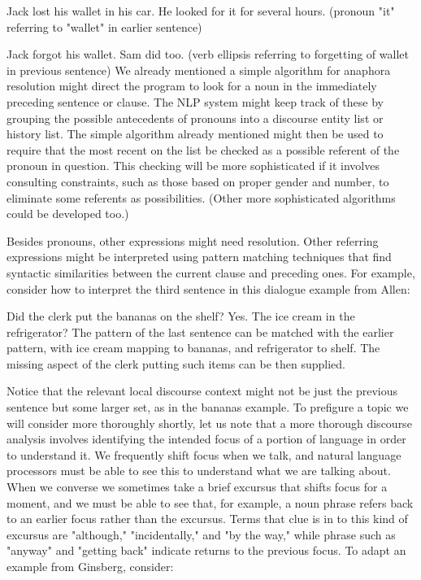 Jack lost his wallet in his car.
He looked for it for several hours. (pronoun "it" referring to "wallet" in earlier sentence)

Jack forgot his wallet.
Sam did too. (verb ellipsis referring to forgetting of wallet in previous sentence) 
We already mentioned a simple algorithm for anaphora resolution might direct the program to look for a noun in the immediately preceding sentence or clause. The NLP system might keep track of these by grouping the possible antecedents of pronouns into a discourse entity list or history list. The simple algorithm already mentioned might then be used to require that the most recent on the list be checked as a possible referent of the pronoun in question. This checking will be more sophisticated if it involves consulting constraints, such as those based on proper gender and number, to eliminate some referents as possibilities. (Other more sophisticated algorithms could be developed too.)

Besides pronouns, other expressions might need resolution. Other referring expressions might be interpreted using pattern matching techniques that find syntactic similarities between the current clause and preceding ones. For example, consider how to interpret the third sentence in this dialogue example from Allen:

Did the clerk put the bananas on the shelf?
Yes.
The ice cream in the refrigerator?
The pattern of the last sentence can be matched with the earlier pattern, with ice cream mapping to bananas, and refrigerator to shelf. The missing aspect of the clerk putting such items can be then supplied.

Notice that the relevant local discourse context might not be just the previous sentence but some larger set, as in the bananas example. To prefigure a topic we will consider more thoroughly shortly, let us note that a more thorough discourse analysis involves identifying the intended focus of a portion of language in order to understand it. We frequently shift focus when we talk, and natural language processors must be able to see this to understand what we are talking about. When we converse we sometimes take a brief excursus that shifts focus for a moment, and we must be able to see that, for example, a noun phrase refers back to an earlier focus rather than the excursus. Terms that clue is in to this kind of excursus are "although," "incidentally," and "by the way," while phrase such as "anyway" and "getting back" indicate returns to the previous focus. To adapt an example from Ginsberg, consider:

